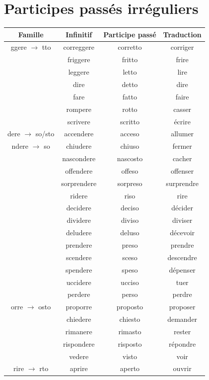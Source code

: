 \documentclass[12pt, openany]{report}
\begin{document}
\section{Participes passés irréguliers}
\begin{center}
    \begin{tabular}{c|c|c|c}
        Famille & Infinitif & Participe passé & Traduction\\ \hline 
        ggere $\to$ tto & correggere & corretto & corriger \\
        & friggere & fritto & frire\\
        & leggere & letto & lire \\
        & dire & detto & dire\\
        & fare & fatto & faire\\
        & rompere & rotto & casser \\
        & scrivere & scritto & écrire\\ \hline 
        dere $\to$ so/sto & accendere & acceso & allumer\\
        ndere $\to$ so & chiudere & chiuso & fermer \\
        & nascondere & nascosto & cacher\\
        & offendere & offeso & offenser\\
        & sorprendere & sorpreso & surprendre\\
        & ridere & riso & rire\\
        & decidere & deciso & décider\\
        & dividere & diviso & diviser\\
        & deludere & deluso & décevoir \\
        & prendere & preso & prendre\\
        & scendere & sceso & descendre\\
        & spendere & speso & dépenser \\
        & uccidere & ucciso & tuer \\\hline 
        & perdere & perso & perdre \\
        orre $\to$ osto & proporre & proposto & proposer \\
        & chiedere & chiesto & demander\\
        & rimanere & rimasto & rester\\
        & rispondere & risposto & répondre\\
        & vedere & visto & voir\\ \hline 
        rire $\to$ rto & aprire & aperto & ouvrir\\

\end{tabular}
\end{center}
\end{document}
